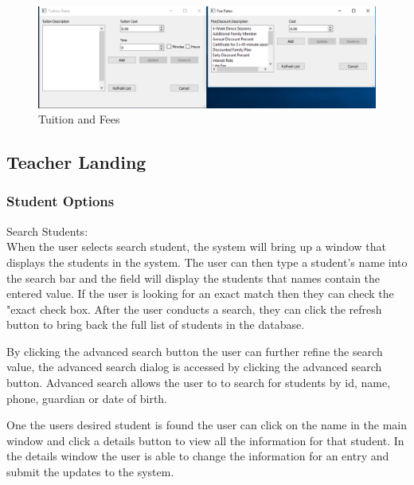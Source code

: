 \begin{figure}
  \includegraphics[width=\linewidth]{pics/userGuide/tuitAndFees.png}
  \caption{Tuition and Fees} 
  \label{fig:User doc: Tuition and Fees}
\end{figure}


\subsection{Teacher Landing}

\subsubsection{Student Options}

Search Students:\\
When the user selects search student, the system will bring up a window that displays the students in the system. The user can then type a student's name into the search bar and the field will display the students that names contain the entered value. If the user is looking for an exact match then they can check the "exact check box. After the user conducts a search, they can click the refresh button to bring back the full list of students in the database.

By clicking the advanced search button the user can further refine the search value, the advanced search dialog is accessed by clicking the advanced search button. Advanced search allows the user to to search for students by id, name, phone, guardian or date of birth.

One the users desired student is found the user can click on the name in the main window and click a details button to view all the information for that student.  In the details window the user is able to change the information for an entry and submit the updates to the system.\\

